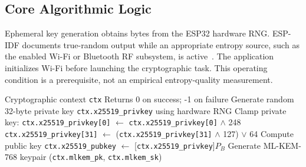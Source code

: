 \documentclass[journal, 10pt]{IEEEtran}
\begin{document}
\subsection{Core Algorithmic Logic}
Ephemeral key generation obtains bytes from the ESP32 hardware RNG. ESP-IDF documents true-random output while an appropriate entropy source, such as the enabled Wi-Fi or Bluetooth RF subsystem, is active~\cite{b43}. The application initializes Wi-Fi before launching the cryptographic task. This operating condition is a prerequisite, not an empirical entropy-quality measurement.

\begin{algorithm}[!t]
\caption{Client Keypair Generation (\texttt{hybrid\_keygen})}
\begin{algorithmic}[1]
\REQUIRE Cryptographic context \texttt{ctx}
\ENSURE Returns 0 on success; -1 on failure
    \STATE Generate random 32-byte private key \texttt{ctx.x25519\_privkey} using hardware RNG
    \STATE Clamp private key:
    \STATE \texttt{ctx.x25519\_privkey[0]} $\leftarrow$ \texttt{ctx.x25519\_privkey[0]} $\wedge$ 248
    \STATE \texttt{ctx.x25519\_privkey[31]} $\leftarrow$ (\texttt{ctx.x25519\_privkey[31]} $\wedge$ 127) $\vee$ 64
    \STATE Compute public key \texttt{ctx.x25519\_pubkey} $\leftarrow$ [\texttt{ctx.x25519\_privkey}]$P_B$
\ENDIF
{}
    \STATE Generate ML-KEM-768 keypair (\texttt{ctx.mlkem\_pk}, \texttt{ctx.mlkem\_sk})
\ENDIF
{}
\end{algorithmic}
\end{algorithm}
\end{document}
